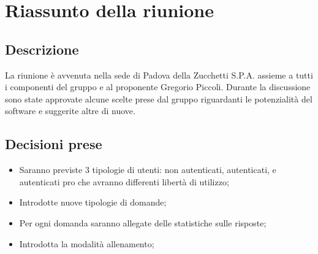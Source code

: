 \section{Riassunto della riunione}
\subsection{Descrizione}
La riunione è avvenuta nella sede di Padova della Zucchetti S.P.A. assieme a tutti i componenti del gruppo e al proponente Gregorio Piccoli. Durante la discussione sono state approvate alcune scelte prese dal gruppo riguardanti le potenzialità del software e suggerite altre di nuove.
\subsection{Decisioni prese}
\begin{itemize}
\item Saranno previste 3 tipologie di utenti: non autenticati, autenticati, e autenticati pro che avranno differenti libertà di utilizzo;
\item Introdotte nuove tipologie di domande;
\item Per ogni domanda saranno allegate delle statistiche sulle risposte;
\item Introdotta la modalità allenamento;
\end{itemize}